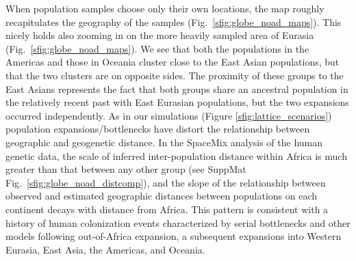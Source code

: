 \documentclass[12pt]{article}
\begin{document}
When population samples choose only their own locations, the map roughly recapitulates the geography of the samples (Fig.\ \ref{sfig:globe_noad_maps}). This nicely holds also zooming in on the more heavily sampled area of Eurasia (Fig.\ \ref{sfig:globe_noad_maps}). We see that both the populations in the Americas and those in Oceania cluster close to the East Asian populations, but that the two clusters are on opposite sides.  The proximity of these groups to the East Asians represents the fact that both groups share an ancestral population in the relatively recent past with East Eurasian populations, but the two expansions occurred independently. As in our simulations (Figure \ref{sfig:lattice_scenarios}) population expansions/bottlenecks have distort the relationship between geographic and geogenetic distance. In the SpaceMix analysis of the human genetic data, the scale of inferred inter-population distance within Africa is much greater than that between any other group (see SuppMat Fig.\ \ref{sfig:globe_noad_distcomp}), and the slope of the relationship between observed and estimated geographic distances between populations on each continent decays with distance from Africa.  This pattern is consistent with a history of human colonization events characterized by serial bottlenecks \citep{Harpending_Rogers_2000,prugnolle_geography_2005,Ramachandran:05} and other models \citep{pickrell_reich:14} following out-of-Africa expansion, a subsequent expansions into Western Eurasia, East Asia, the Americas, and Oceania. 
\end{document}
